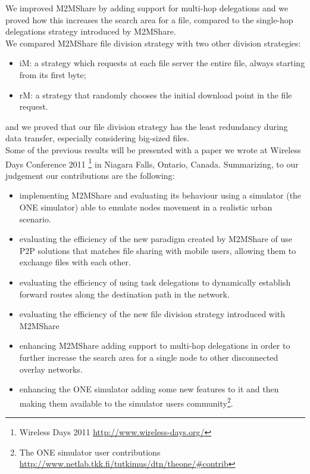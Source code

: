 We improved M2MShare by adding support for multi-hop delegations and we proved how this increases the search area for a file, compared to the single-hop delegations strategy introduced by M2MShare.
\\

We compared M2MShare file division strategy with two other division strategies:
\begin{itemize}
\item iM: a strategy which requests at each file server the entire file, always starting from its first byte;
\item rM: a strategy that randomly chooses the initial download point in the file request.
\end{itemize}
and we proved that our file division strategy has the least redundancy during data transfer, especially considering big-sized files.
\\

Some of the previous results will be presented with a paper we wrote at Wireless Days Conference 2011 \footnote{Wireless Days 2011 \href{http://www.wireless-days.org/}{http://www.wireless-days.org/}} in Niagara Falls, Ontario, Canada.
Summarizing, to our judgement our contributions are the following:
\begin{itemize}
\item implementing M2MShare and evaluating its behaviour using a simulator (the ONE simulator) able to emulate nodes movement in a realistic urban scenario.
\item evaluating the efficiency of the new paradigm created by M2MShare of use P2P solutions that matches file sharing with mobile users, allowing them to exchange files with each other.
\item evaluating the efficiency of using task delegations to dynamically establish forward routes along the destination path in the network.
\item evaluating the efficiency of the new file division strategy introduced with M2MShare 
\item enhancing M2MShare adding support to multi-hop delegations in order to further increase the search area for a single node to other disconnected overlay networks.
\item enhancing the ONE simulator adding some new features to it and then making them available to the simulator users community\footnote{The ONE simulator user contributions \href{http://www.netlab.tkk.fi/tutkimus/dtn/theone/\#contrib}{http://www.netlab.tkk.fi/tutkimus/dtn/theone/\#contrib}}.
\end{itemize}

